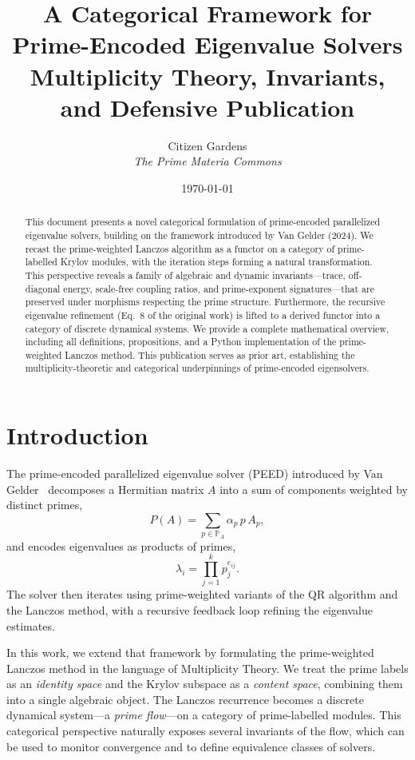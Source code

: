 \documentclass[12pt]{article}
\title{\bfseries A Categorical Framework for Prime-Encoded Eigenvalue Solvers\\
\large Multiplicity Theory, Invariants, and Defensive Publication}
\author{Citizen Gardens \\  \textit{The Prime Materia Commons}}
\date{\today}
\theoremstyle{plain}
\theoremstyle{definition}
\theoremstyle{remark}
\begin{document}
\maketitle

\begin{abstract}
This document presents a novel categorical formulation of prime-encoded parallelized eigenvalue solvers, building on the framework introduced by Van Gelder (2024). 
We recast the prime-weighted Lanczos algorithm as a functor on a category of prime-labelled Krylov modules, with the iteration steps forming a natural transformation. 
This perspective reveals a family of algebraic and dynamic invariants—trace, off-diagonal energy, scale-free coupling ratios, and prime-exponent signatures—that are preserved under morphisms respecting the prime structure. 
Furthermore, the recursive eigenvalue refinement (Eq.~8 of the original work) is lifted to a derived functor into a category of discrete dynamical systems. 
We provide a complete mathematical overview, including all definitions, propositions, and a Python implementation of the prime-weighted Lanczos method. 
This publication serves as prior art, establishing the multiplicity-theoretic and categorical underpinnings of prime-encoded eigensolvers.
\end{abstract}

\section{Introduction}
The prime-encoded parallelized eigenvalue solver (PEED) introduced by Van Gelder~\cite{vangelder2024} decomposes a Hermitian matrix $A$ into a sum of components weighted by distinct primes,
\begin{equation}\label{eq:prime-decomp}
P(A) = \sum_{p\in\mathbb{P}_A} \alpha_p\, p\, A_p,
\end{equation}
and encodes eigenvalues as products of primes,
\begin{equation}\label{eq:prime-eig}
\lambda_i = \prod_{j=1}^k p_j^{e_{ij}}.
\end{equation}
The solver then iterates using prime-weighted variants of the QR algorithm and the Lanczos method, with a recursive feedback loop refining the eigenvalue estimates.

In this work, we extend that framework by formulating the prime-weighted Lanczos method in the language of Multiplicity Theory. 
We treat the prime labels as an \emph{identity space} and the Krylov subspace as a \emph{content space}, combining them into a single algebraic object. 
The Lanczos recurrence becomes a discrete dynamical system—a \emph{prime flow}—on a category of prime-labelled modules. 
This categorical perspective naturally exposes several invariants of the flow, which can be used to monitor convergence and to define equivalence classes of solvers.
\end{document}

